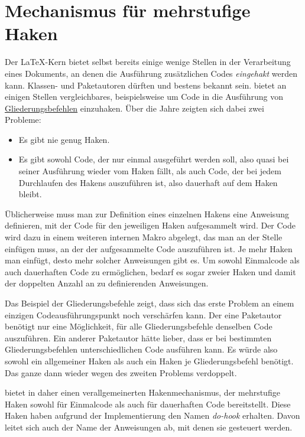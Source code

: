 \section[{Mechanismus für mehrstufige Haken}]
{Mechanismus für mehrstufige
  Haken}

\BeginIndexGroup
{}
Der \LaTeX-Kern bietet selbst bereits einige wenige Stellen in der
Verarbeitung eines Dokuments, an denen die Ausführung zusätzlichen Codes
\emph{eingehakt} werden kann. Klassen- und Paketautoren dürften
 und  bestens bekannt
sein. \KOMAScript{} bietet an einigen Stellen vergleichbares, beispielsweise
um Code in die Ausführung von
\hyperref[sec:maincls.structure]{Gliederungsbefehlen} einzuhaken. Über die
Jahre zeigten sich dabei zwei Probleme:
\begin{itemize}
\item Es gibt nie genug Haken.
\item Es gibt sowohl Code, der nur einmal ausgeführt werden soll, also quasi
  bei seiner Ausführung wieder vom Haken fällt, als auch Code, der bei jedem
  Durchlaufen des Hakens auszuführen ist, also dauerhaft auf dem Haken bleibt.
\end{itemize}
Üblicherweise muss man zur Definition eines einzelnen Hakens eine Anweisung
definieren, mit der Code für den jeweiligen Haken aufgesammelt wird. Der Code
wird dazu in einem weiteren internen Makro abgelegt, das man an der Stelle
einfügen muss, an der der aufgesammelte Code auszuführen ist. Je mehr Haken
man einfügt, desto mehr solcher Anweisungen gibt es. Um sowohl Einmalcode als
auch dauerhaften Code zu ermöglichen, bedarf es sogar zweier Haken und damit
der doppelten Anzahl an zu definierenden Anweisungen.

Das Beispiel der Gliederungsbefehle zeigt, dass sich das erste Problem
an einem einzigen Codeausführungspunkt noch verschärfen kann. Der
eine Paketautor benötigt nur eine Möglichkeit, für alle
Gliederungsbefehle denselben Code auszuführen. Ein anderer Paketautor hätte
lieber, dass er bei bestimmten Gliederungsbefehlen unterschiedlichen Code
ausführen kann. Es würde also sowohl ein allgemeiner Haken als auch ein Haken
je Gliederungsbefehl benötigt. Das ganze dann wieder wegen des zweiten
Problems verdoppelt.

\KOMAScript{} bietet in  daher einen verallgemeinerten
Hakenmechanismus, der mehrstufige Haken sowohl für Einmalcode als auch für
dauerhaften Code bereitstellt. Diese Haken haben aufgrund der Implementierung
den Namen \emph{do-hook} erhalten. Davon leitet sich auch der Name der
Anweisungen ab, mit denen sie gesteuert werden.

